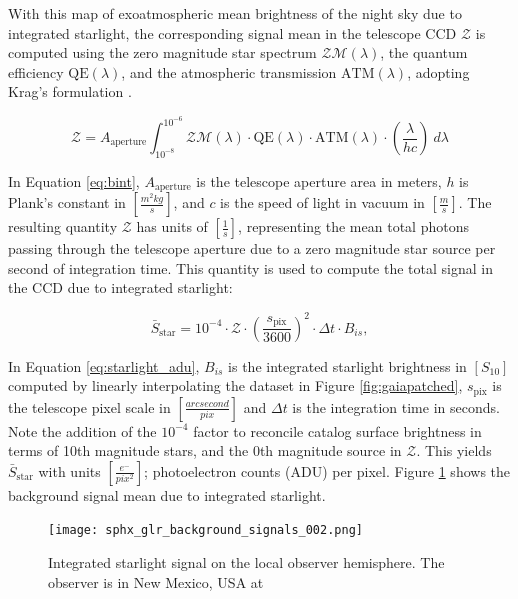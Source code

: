 With this map of exoatmospheric mean brightness of the night sky due to integrated
starlight, the corresponding signal mean in the telescope CCD $\mathcal{Z}$ is computed using the zero magnitude star spectrum $\mathcal{ZM}(\lambda)$, the quantum efficiency $\textrm{QE}(\lambda)$, and the atmospheric transmission $\textrm{ATM}(\lambda)$, adopting Krag's formulation \cite{krag2003}.

\begin{equation} \label{eq:bint}
 \mathcal{Z} = A_\mathrm{aperture}
  \int_{10^{-8}}^{10^{-6}}{ \mathcal{ZM}(\lambda) \cdot \textrm{QE}(\lambda) \cdot \textrm{ATM}(\lambda)
  \cdot \left( \frac{\lambda}{h c} \right) \: d\lambda}  
\end{equation}

In Equation \ref{eq:bint}, $A_\mathrm{aperture}$ is the telescope aperture area in meters, $h$ is Plank's constant in $\left[ \frac{m^2 kg}{s} \right]$, and $c$ is the speed of light in vacuum in $\left[ \frac{m}{s} \right]$. The resulting quantity $\mathcal{Z}$ has units of $\left[ \frac{1}{s} \right]$, representing the mean total photons passing through the telescope aperture due to a zero magnitude star source per second of integration time. This quantity is used to compute the total signal in the CCD due to integrated starlight:

\begin{equation} \label{eq:starlight_adu}
  \bar{S}_\mathrm{star} = 10^{-4} \cdot \mathcal{Z} \cdot \left( \frac{s_\mathrm{pix}}{3600} \right)^2 \cdot \Delta t \cdot
  B_{is},
\end{equation}

In Equation \ref{eq:starlight_adu}, $B_{is}$ is the integrated starlight brightness in $\left[ S_{10}\right]$ computed by linearly interpolating the dataset in Figure \ref{fig:gaiapatched}, $s_\mathrm{pix}$ is the telescope pixel scale in $\left[ \frac{arcsecond}{pix} \right]$ and $\Delta t$ is the integration time in seconds. Note the addition of the $10^{-4}$ factor to reconcile catalog surface brightness in terms of 10th magnitude stars, and the 0th magnitude source in $\mathcal{Z}$. This yields $\bar{S}_\mathrm{star}$ with units $\left[ \frac{e^-}{pix^2} \right]$; photoelectron counts (ADU) per pixel. Figure \ref{fig:starlight_hemi} shows the background signal mean due to integrated starlight.

\begin{figure}[ht]
  \centering
  \texttt{[image: sphx\_glr\_background\_signals\_002.png]}
  \caption{Integrated starlight signal on the local observer hemisphere. The observer is in New Mexico, USA at
  \pogslla}
  \label{fig:starlight_hemi}
\end{figure}

